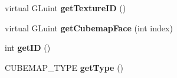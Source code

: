 \begin{DoxyCompactItemize}
\item 
virtual G\+Luint {\bfseries get\+Texture\+ID} ()\hypertarget{class_cube_map_ae53c8617abedefbac800926e0e1996bc}{}\label{class_cube_map_ae53c8617abedefbac800926e0e1996bc}

\item 
virtual G\+Luint {\bfseries get\+Cubemap\+Face} (int index)\hypertarget{class_cube_map_a33de9d0608fa3b665723a83b6772ac76}{}\label{class_cube_map_a33de9d0608fa3b665723a83b6772ac76}

\item 
int {\bfseries get\+ID} ()\hypertarget{class_cube_map_a656ddc444646dc9a7382eb0a4c98a975}{}\label{class_cube_map_a656ddc444646dc9a7382eb0a4c98a975}

\item 
C\+U\+B\+E\+M\+A\+P\+\_\+\+T\+Y\+PE {\bfseries get\+Type} ()\hypertarget{class_cube_map_a241521b1b98238e4a76897da86893765}{}\label{class_cube_map_a241521b1b98238e4a76897da86893765}

\end{DoxyCompactItemize}

